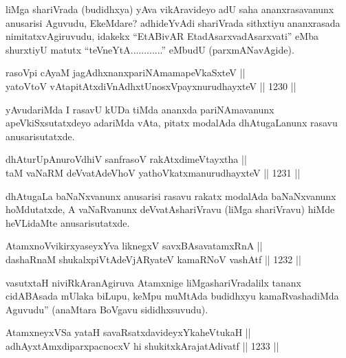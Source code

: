 \begin{artha}
liMga shariVrada (budidhxya) yAva vikAravideyo adU saha ananxrasavanunx anusarisi Aguvudu, EkeMdare? adhideYvAdi shariVrada sithxtiyu ananxrasada nimitatxvAgiruvudu, idakekx ``EtABivAR EtadAsarxvadAsarxvati'' eMba shurxtiyU matutx ``teVneYtA............'' eMbudU (parxmANavAgide).
\end{artha}

\begin{shl}
rasoV\s pi cAyaM jagAdhxnanxpariNAmamapeVkaSxteV ||  \\
yatoV\s toV vAtapitAtxdiVnAdhxtUnosxV\s payxnurudhayxteV \hfill || 1230 ||  
\end{shl}

\begin{artha}
yAvudariMda I rasavU kUDa tiMda ananxda pariNAmavanunx apeVkiSxsutatxdeyo adariMda vAta, pitatx modalAda dhAtugaLanunx rasavu anusarisutatxde.
\end{artha}


\begin{shl}
dhAturUpAnuroVdhiV sanfrasoV rakAtxdimeVtayxtha || \\
taM vaNaRM deVvatAdeVhoV yathoVkatxmanurudhayxteV \hfill || 1231 ||  
\end{shl}

\begin{artha}
dhAtugaLa baNaNxvanunx anusarisi rasavu rakatx modalAda baNaNxvanunx hoMdutatxde, A vaNaRvanunx deVvatAshariVravu (liMga shariVravu) hiMde heVLidaMte anusarisutatxde.
\end{artha}


\begin{shl}
AtamxnoV\s vikirxyaseyxYva liknegxV savxBAsavatamxRnA ||  \\
dashaRnaM shukalxpiVtAdeVjARyateV kamaRNoV vashAtf \hfill || 1232 ||  
\end{shl}

\begin{artha}
vasutxtaH niviRkAranAgiruva Atamxnige liMgashariVradalilx tananx cidABAsada mUlaka biLupu, keMpu muMtAda budidhxyu kamaRvashadiMda Aguvudu'' (anaMtara BoVgavu sididhxsuvudu).
\end{artha}


\begin{shl}
AtamxneyxVSa yataH savaRsatxdavideyxYkaheVtukaH || \\
adhAyxtAmxdiparxpacnocxV hi shukitxkArajatAdivatf \hfill || 1233 ||  
\end{shl}

